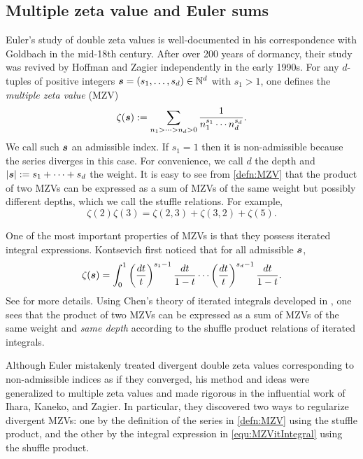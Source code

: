 \documentclass{article}
\newcommand{\bfs}{{\boldsymbol{\sl{s}}}}
\newcommand{\N}{\mathbb{N}}
\theoremstyle{plain}
\theoremstyle{definition}
\begin{document}
\subsection{Multiple zeta value and Euler sums}
Euler's study of double zeta values is well-documented in his correspondence with Goldbach in the mid-18th century. After over 200 years of dormancy, their study was revived by Hoffman \cite{Hoffman1992} and Zagier \cite{Zagier1994} independently in the early 1990s. For any $d$-tuples of positive integers $\bfs=(s_1,\dots,s_d)\in\N^d$ with $s_1>1$, one defines the \emph{multiple zeta value} (MZV)
\begin{equation}\label{defn:MZV}
\zeta(\bfs):=\sum_{n_1>\dots>n_d>0}  \frac{1}{n_1^{s_1}\cdots n_d^{s_d}}.
\end{equation}
We call such $\bfs$ an admissible index. If $s_1=1$ then it is non-admissible because the series diverges in this case. For convenience, we call $d$ the depth and $|\bfs|:=s_1+\dots+s_d$ the weight. It is easy to see from \eqref{defn:MZV} that the product of two MZVs can be expressed as a sum of MZVs of the same weight but possibly different depths, which we call the stuffle relations. For example,
\begin{equation*}
    \zeta(2)\zeta(3)=\zeta(2,3)+\zeta(3,2)+\zeta(5).
\end{equation*}


One of the most important properties of MZVs is that they possess iterated integral expressions. Kontsevich first noticed that
for all admissible $\bfs$,
\begin{equation}\label{equ:MZVitIntegral}
\zeta(\bfs)=\int_0^1  \left(\frac{dt}{t}\right)^{s_1-1}\frac{dt}{1-t} \cdots \left(\frac{dt}{t}\right)^{s_d-1}\frac{dt}{1-t}.
\end{equation}
See \cite[\S 2.1]{Zhao2016} for more details. Using Chen's theory of iterated integrals developed in \cite{KTChen1971,KTChen1977}, one sees that the product of two MZVs can be expressed as a sum of MZVs of the same weight and \emph{same depth} according to the shuffle product relations of iterated integrals.

Although Euler mistakenly treated divergent double zeta values corresponding to non-admissible indices
as if they converged, his method and ideas were generalized to multiple zeta values and made rigorous in the influential work \cite{IKZ2006} of Ihara, Kaneko, and Zagier. In particular, they discovered two ways to regularize divergent MZVs: one by the definition of the series in \eqref{defn:MZV} using the stuffle product, and the other by the integral expression in \eqref{equ:MZVitIntegral} using the shuffle product.
\end{document}
